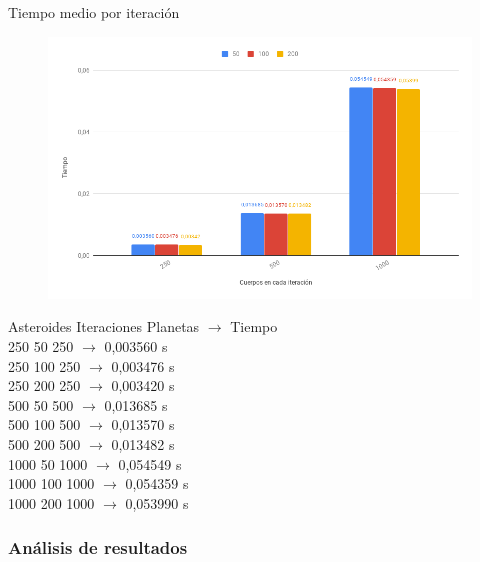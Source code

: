 \documentclass[12pt]{article}
\begin{document}
            \newpage
            \begin{center}
                Tiempo medio por iteración
            \end{center}
            \begin{figure}[hbt!]
                \centering
                \includegraphics[width=\linewidth]{images/chart2.png}
            \end{figure}
        
            \begin{center}
                \noindent Asteroides Iteraciones Planetas $\rightarrow$ Tiempo \\
                250 50 250 $\rightarrow$ 0,003560 s \\
                250 100 250 $\rightarrow$ 0,003476 s \\
                250 200 250 $\rightarrow$ 0,003420 s \\
                500 50 500 $\rightarrow$ 0,013685 s \\
                500 100 500 $\rightarrow$ 0,013570 s \\
                500 200 500 $\rightarrow$ 0,013482 s \\
                1000 50 1000 $\rightarrow$ 0,054549 s \\
                1000 100 1000 $\rightarrow$ 0,054359 s \\
                1000 200 1000 $\rightarrow$ 0,053990 s \\
            \end{center}
        
        \newpage
        \subsubsection{Análisis de resultados}
    \newpage
\end{document}

